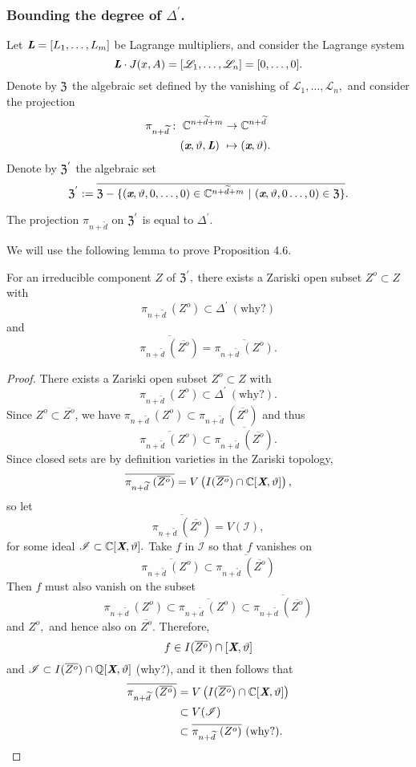 \documentclass[sigconf]{acmart}
\def\Xb{\textit{\textbf{X}}}
\def\C{\mathbb{C}}
\def\vt{\vartheta}
\def\dt{\widetilde{d}}
\def\D{\Delta}
\def\Z{\frak{Z}}
\begin{document}
\subsubsection{Bounding the degree of $\Delta^{'}$.}
% 
Let $\textit{\textbf{L}}=[L_1,\hdots,L_m]$ be Lagrange multipliers, and consider the Lagrange system 
\[
\textit{\textbf{L}}\cdot J(x,A)=[\mathscr{L}_1,\hdots,\mathscr{L}_{n}]=[0,\hdots,0].
\] 
Denote by $\frak{Z}$ the algebraic set defined by the vanishing of $\mathscr{L}_1,\hdots,\mathscr{L}_{n},$ and consider the projection 
%
\begin{align*} 
\pi_{n+\dt} :~ \C^{n+\dt+m} &\rightarrow \C^{n+\dt}\\
(\textit{\textbf{x}},\vt,\textit{\textbf{L}})~ &\mapsto (\textit{\textbf{x}},\vt).
\end{align*}
%
Denote by $\frak{Z}^{'}$ the algebraic set
\[
\frak{Z}^{'} := \overline{\frak{Z} - \{(\textit{\textbf{x}},\vt,0,\hdots,0) \in \C^{n+\dt+m}~|~(\textit{\textbf{x}},\vt,0\hdots,0) \in \frak{Z}\}}.
\]
%
\begin{proposition}  
The projection $\pi_{n+\dt}$ on $\frak{Z}^{'}$ is equal to $\Delta^{'}$.
\end{proposition}
%
We will use the following lemma to prove Proposition 4.6.
%
\begin{lemma} 
For an irreducible component $Z$ of $\Z^{'},$ there exists a Zariski open subset $Z^o \subset Z$ with \[\pi_{n+\dt}~(Z^{o}) \subset \D^{'}~(\textrm{why?})\]
and
\[
\overline{\pi_{n+\dt}~(\overline{Z^o})} = \overline{\pi_{n+\dt}~(Z^o)}.
\] 
\end{lemma} 
%
\begin{proof}
There exists a Zariski open subset $Z^o \subset Z$ with 
\[
\pi_{n+\dt}~(Z^{o}) \subset \D^{'}~(\textrm{why?}).
\] 
Since $Z^o \subset \overline{Z^o}$, we have $\pi_{n+\dt}~(Z^o) \subset \pi_{n+\dt}~(\overline{Z^o})$ and thus 
\[
\overline{\pi_{n+\dt}~(Z^o)} \subset \overline{\pi_{n+\dt}~(\overline{Z^o})}.
\]   
Since closed sets are by definition varieties in the Zariski topology, \[\overline{\pi_{n+\dt}~(\overline{Z^o})} = V\left( I(\overline{Z^o}) \cap \mathbb{C}[\textit{\textbf{X}},\vt]\right),
\] 
so let 
\[
\overline{\pi_{n+\dt}~(\overline{Z^o})} = V(\mathscr{I}),
\] 
for some ideal $\mathscr{I} \subset \C[\Xb,\vt].$ Take $f$ in $\mathscr{I}$ so that $f$ vanishes on 
\[
\overline{\pi_{n+\dt}~(Z^o)}\subset \overline{\pi_{n+\dt}~(\overline{Z^o})}
\]
Then $f$ must also vanish on the subset 
\[
\pi_{n+\dt}~(Z^o)\subset \overline{\pi_{n+\dt}~(Z^o)}\subset \overline{\pi_{n+\dt}~(\overline{Z^o})}
\]
and $Z^o,$ and hence also on $\overline{Z^o}.$ Therefore, 
\[
f \in I(\overline{Z^o}) \cap \mathbb{}[\textit{\textbf{X}},\vt]
\]
and  $\mathscr{I} \subset I(\overline{Z^o}) \cap \mathbb{Q}[\textit{\textbf{X}},\vt]$ (why?), and it then follows that 
%
\begin{align*}
\overline{\pi_{n+\dt}~(\overline{Z^o})}&=V\left(I(\overline{Z^o})\cap \mathbb{C}[\textit{\textbf{X}},\vt]\right) \\&\subset V(\mathscr{I})\\&\subset \overline{\pi_{n + \dt}~(Z^o)}\textrm{ (why?)}.
\end{align*}
%
\end{proof}
\end{document}
